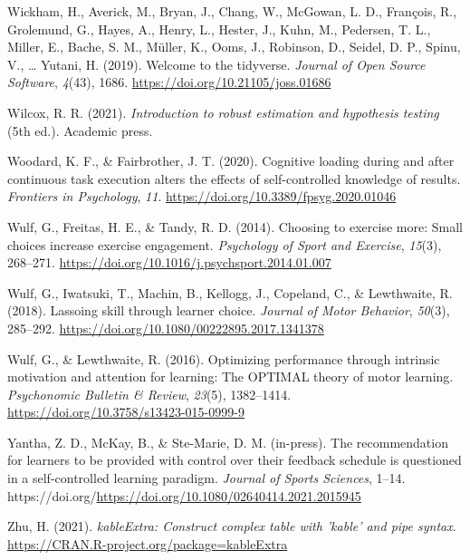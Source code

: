 \documentclass[
  man, donotrepeattitle,floatsintext]{apa7}
\newlength{\cslhangindent}
\newlength{\cslentryspacingunit} %
\newenvironment{CSLReferences}[2] %
 {%
  \setlength{\parindent}{0pt}
  \ifodd #1
  \let\oldpar\par
  \def\par{\hangindent=\cslhangindent\oldpar}
  \fi
  \setlength{\parskip}{#2\cslentryspacingunit}
 }%
 {}
\begin{document}
\begin{CSLReferences}{1}{0}
\leavevmode{}%
Wickham, H., Averick, M., Bryan, J., Chang, W., McGowan, L. D., François, R., Grolemund, G., Hayes, A., Henry, L., Hester, J., Kuhn, M., Pedersen, T. L., Miller, E., Bache, S. M., Müller, K., Ooms, J., Robinson, D., Seidel, D. P., Spinu, V., \ldots{} Yutani, H. (2019). Welcome to the {tidyverse}. \emph{Journal of Open Source Software}, \emph{4}(43), 1686. \url{https://doi.org/10.21105/joss.01686}

\leavevmode{}%
Wilcox, R. R. (2021). \emph{Introduction to robust estimation and hypothesis testing} (5th ed.). Academic press.

\leavevmode{}%
Woodard, K. F., \& Fairbrother, J. T. (2020). Cognitive loading during and after continuous task execution alters the effects of self-controlled knowledge of results. \emph{Frontiers in Psychology}, \emph{11}. \url{https://doi.org/10.3389/fpsyg.2020.01046}

\leavevmode{}%
Wulf, G., Freitas, H. E., \& Tandy, R. D. (2014). Choosing to exercise more: {Small} choices increase exercise engagement. \emph{Psychology of Sport and Exercise}, \emph{15}(3), 268--271. \url{https://doi.org/10.1016/j.psychsport.2014.01.007}

\leavevmode{}%
Wulf, G., Iwatsuki, T., Machin, B., Kellogg, J., Copeland, C., \& Lewthwaite, R. (2018). Lassoing skill through learner choice. \emph{Journal of Motor Behavior}, \emph{50}(3), 285--292. \url{https://doi.org/10.1080/00222895.2017.1341378}

\leavevmode{}%
Wulf, G., \& Lewthwaite, R. (2016). Optimizing performance through intrinsic motivation and attention for learning: {The} {OPTIMAL} theory of motor learning. \emph{Psychonomic Bulletin \& Review}, \emph{23}(5), 1382--1414. \url{https://doi.org/10.3758/s13423-015-0999-9}

\leavevmode{}%
Yantha, Z. D., McKay, B., \& Ste-Marie, D. M. (in-press). The recommendation for learners to be provided with control over their feedback schedule is questioned in a self-controlled learning paradigm. \emph{Journal of Sports Sciences}, 1--14. https://doi.org/\url{https://doi.org/10.1080/02640414.2021.2015945}

\leavevmode{}%
Zhu, H. (2021). \emph{kableExtra: Construct complex table with 'kable' and pipe syntax}. \url{https://CRAN.R-project.org/package=kableExtra}

\end{CSLReferences}
\end{document}
